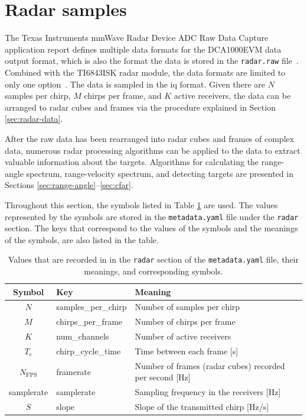 \section{Radar samples}
\label{sec:radar-file}
The Texas Instruments mmWave Radar Device ADC Raw Data Capture application report defines multiple data formats for the DCA1000EVM data output format,
which is also the format the data is stored in the \texttt{radar.raw} file~\cite{dca1000-raw-data-capture}.
Combined with the TI6843ISK radar module, the data formats are limited to only one option~\cite{mmwave-sdk-user-guide}.
The data is sampled in the \gls{iq} format.
Given there are $N$ samples per chirp, $M$ chirps per frame, and $K$ active receivers,
the data can be arranged to radar cubes and frames via the procedure explained in Section \ref{sec:radar-data}.

After the raw data has been rearranged into radar cubes and frames of complex data,
numerous radar processing algorithms can be applied to the data to extract valuable information about the targets.
Algorithms for calculating the range-angle spectrum, range-velocity spectrum, and detecting targets are presented in Sections \ref{sec:range-angle}--\ref{sec:cfar}.

Throughout this section, the symbols listed in Table \ref{tab:radar-symbols} are used.
The values represented by the symbols are stored in the \texttt{metadata.yaml} file
under the \texttt{radar} section.
The keys that correspond to the values of the symbols and the meanings of the symbols, are also listed in the table.

\begin{table}[h]
    \centering
    \begin{tabular}{c l p{3in}}
    \toprule
        \textbf{Symbol} & \textbf{Key} & \textbf{Meaning} \\
    \midrule
         $N$ & samples\_per\_chirp & Number of samples per chirp \\
         $M$ & chirps\_per\_frame & Number of chirps per frame \\
         $K$ & num\_channels & Number of active receivers \\
         $T_{\mathrm{c}}$ & chirp\_cycle\_time & Time between each frame [s] \\
         $N_{\mathrm{FPS}}$ & framerate & Number of frames (radar cubes) recorded per second [Hz] \\
         \gls{samplerate} & samplerate & Sampling frequency in the receivers [Hz] \\
         $S$ & slope & Slope of the transmitted chirp [Hz/s] \\
    \bottomrule
    \end{tabular}
    \caption{
        Values that are recorded in in the \texttt{radar} section of the \texttt{metadata.yaml} file,
        their meanings, and corresponding symbols.
    }
    \label{tab:radar-symbols}
\end{table}

